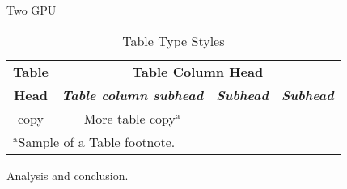Two GPU

\begin{table}[htbp]
    \caption{Table Type Styles}
    \begin{center}
    \begin{tabular}{|c|c|c|c|}
    \hline
    \textbf{Table}&\multicolumn{3}{|c|}{\textbf{Table Column Head}} \\
    \cline{2-4} 
    \textbf{Head} & \textbf{\textit{Table column subhead}}& \textbf{\textit{Subhead}}& \textbf{\textit{Subhead}} \\
    \hline
    copy& More table copy$^{\mathrm{a}}$& &  \\
    \hline
    \multicolumn{4}{l}{$^{\mathrm{a}}$Sample of a Table footnote.}
    \end{tabular}
    \label{tab1}
    \end{center}
\end{table}

Analysis and conclusion.     